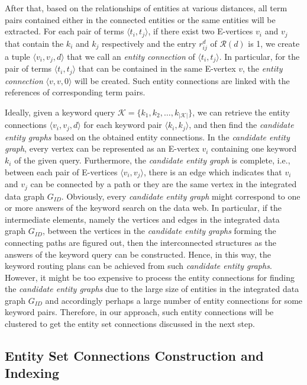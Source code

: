 After that, based on the relationships of entities at various distances, all term pairs contained
either in the connected entities or the same entities will be extracted. For each pair of terms
$\langle t_i,t_j \rangle$, if there exist two E-vertices $v_i$ and $v_j$ that contain the $k_i$ and
$k_j$ respectively and the entry $r^d_{ij}$ of $\mathcal{R}(d)$ is 1, we create a tuple $\langle
v_i,v_j,d \rangle$ that we call an \emph{entity connection} of $\langle t_i,t_j \rangle$. In
particular, for the pair of terms $\langle t_i,t_j \rangle$ that can be contained in the same
E-vertex $v$, the \emph{entity connection} $\langle v,v,0 \rangle$ will be created. Such entity
connections are linked with the references of corresponding term pairs.

Ideally, given a keyword query $\mathcal{K}
=\{k_1,k_2,\ldots,k_{\left\vert\mathcal{K}\right\vert}\}$, we can retrieve the entity connections
$\langle v_i,v_j,d \rangle$ for each keyword pair $\langle k_i,k_j \rangle$, and then find the
\emph{candidate entity graphs} based on the obtained entity connections. In the \emph{candidate
entity graph}, every vertex can be represented as an E-vertex $v_i$ containing one keyword $k_i$ of
the given query. Furthermore, the \emph{candidate entity graph} is complete, i.e., between each pair
of E-vertices $\langle v_i,v_j \rangle$, there is an edge which indicates that $v_i$ and $v_j$ can be
connected by a path or they are the same vertex in the integrated data graph $G_{ID}$. Obviously,
every \emph{candidate entity graph} might correspond to one or more answers of the keyword search on
the data web. In particular, if the intermediate elements, namely the vertices and edges in the
integrated data graph $G_{ID}$, between the vertices in the \emph{candidate entity graphs} forming
the connecting paths are figured out, then the interconnected structures as the answers of the
keyword query can be constructed. Hence, in this way, the keyword routing plans can be achieved from
such \emph{candidate entity graphs}. However, it might be too expensive to process the entity
connections for finding the \emph{candidate entity graphs} due to the large size of entities in the
integrated data graph $G_{ID}$ and accordingly perhaps a large number of entity connections for some
keyword pairs. Therefore, in our approach, such entity connections will be clustered to get the
entity set connections discussed in the next step.

\subsection{Entity Set Connections Construction and Indexing}

